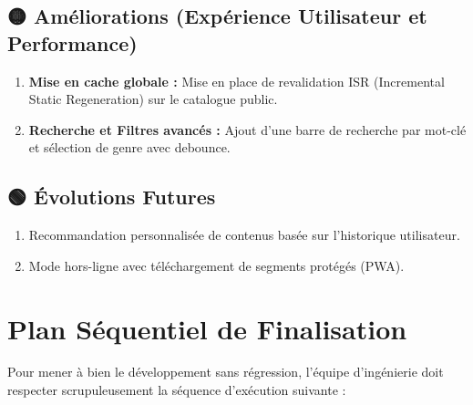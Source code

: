 \documentclass[11pt,a4paper]{article}
\begin{document}
\subsection{🟡 Améliorations (Expérience Utilisateur et Performance)}
\begin{enumerate}
    \item \textbf{Mise en cache globale :} Mise en place de revalidation ISR (Incremental Static Regeneration) sur le catalogue public.
    \item \textbf{Recherche et Filtres avancés :} Ajout d'une barre de recherche par mot-clé et sélection de genre avec debounce.
\end{enumerate}

\subsection{🟢 Évolutions Futures}
\begin{enumerate}
    \item Recommandation personnalisée de contenus basée sur l'historique utilisateur.
    \item Mode hors-ligne avec téléchargement de segments protégés (PWA).
\end{enumerate}

\section{Plan Séquentiel de Finalisation}

Pour mener à bien le développement sans régression, l'équipe d'ingénierie doit respecter scrupuleusement la séquence d'exécution suivante :
\end{document}
